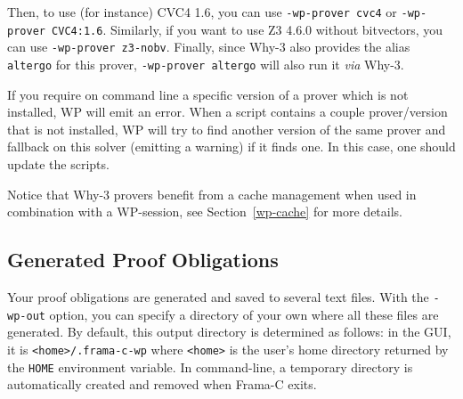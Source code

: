 Then, to use (for instance) \textsf{CVC4 1.6},
you can use \verb+-wp-prover cvc4+ or \verb+-wp-prover CVC4:1.6+.
Similarly, if you want to use \textsf{Z3 4.6.0} without bitvectors, you can use \verb+-wp-prover z3-nobv+.
Finally, since \textsf{Why-3} also provides the alias
\verb+altergo+ for this prover, \verb+-wp-prover altergo+ will also run it \emph{via} \textsf{Why-3}.

If you require on command line a specific version of a prover which is not
installed, \textsf{WP} will emit an error. When a script contains a couple
prover/version that is not installed, \textsf{WP} will try to find another
version of the same prover and fallback on this solver (emitting a warning) if
it finds one. In this case, one should update the scripts.

Notice that \textsf{Why-3} provers benefit from a cache management when used in combination
with a \textsf{WP}-session, see Section~\ref{wp-cache} for more details.



\subsection{Generated Proof Obligations}
Your proof obligations are generated and saved to several text
files. With the \texttt{-wp-out} option, you can specify a directory
of your own where all these files are generated. By default, this
output directory is determined as follows: in the GUI, it is
\texttt{<home>/.frama-c-wp} where \texttt{<home>} is the user's home
directory returned by the \texttt{HOME} environment variable. In
command-line, a temporary directory is automatically created and
removed when \textsf{Frama-C} exits.


